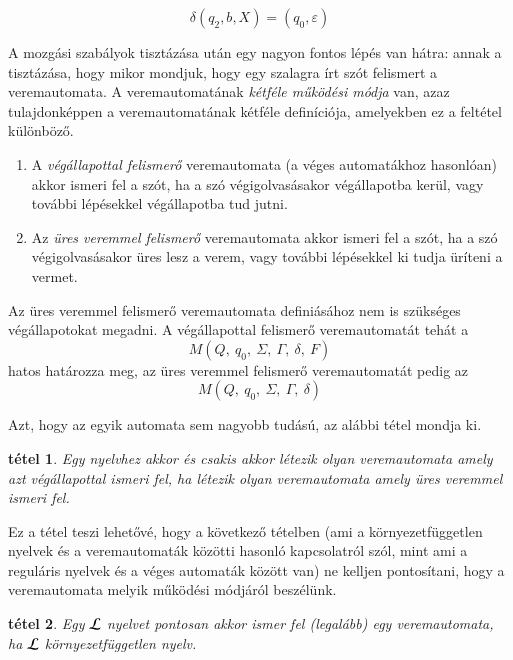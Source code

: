 \documentclass[a4paper]{article}
\newtheorem{tetel}{tétel}[section]
\begin{document}
\begin{equation*}
    \delta(q_2, b, X) = (q_0, \varepsilon)
\end{equation*}

A mozgási szabályok tisztázása után egy nagyon fontos lépés van hátra:
annak a tisztázása, hogy mikor mondjuk, hogy egy szalagra írt szót
felismert a veremautomata.
A veremautomatának \emph{kétféle működési módja} van, azaz
tulajdonképpen a veremautomatának kétféle definíciója, amelyekben ez a
feltétel különböző.
\begin{enumerate}
    \item A \emph{végállapottal felismerő} veremautomata (a véges
        automatákhoz hasonlóan) akkor ismeri fel a szót, ha a szó
        végigolvasásakor végállapotba kerül, vagy további lépésekkel
        végállapotba tud jutni.
    \item Az \emph{üres veremmel felismerő} veremautomata akkor ismeri
        fel a szót, ha a szó végigolvasásakor üres lesz a verem, vagy
        további lépésekkel ki tudja üríteni a vermet.
\end{enumerate}

Az üres veremmel felismerő veremautomata definiásához  nem is szükséges
végállapotokat megadni. A végállapottal felismerő veremautomatát tehát a
\begin{equation*}
    M(Q,\: q_0,\: \Sigma,\: \Gamma,\: \delta,\: F)
\end{equation*}
hatos határozza meg, az üres veremmel felismerő veremautomatát pedig az
\begin{equation*}
    M(Q,\: q_0,\: \Sigma,\: \Gamma,\: \delta)
\end{equation*}

Azt, hogy az egyik automata sem nagyobb tudású, az alábbi tétel mondja
ki.

\begin{tetel}
    Egy nyelvhez akkor és csakis akkor létezik olyan veremautomata amely
    azt végállapottal ismeri fel, ha létezik olyan veremautomata amely
    üres veremmel ismeri fel.
\end{tetel}

Ez a tétel teszi lehetővé, hogy a következő tételben (ami a
környezetfüggetlen nyelvek és a veremautomaták közötti hasonló
kapcsolatról szól, mint ami a reguláris nyelvek és a véges automaták
között van) ne kelljen pontosítani, hogy a veremautomata melyik működési
módjáról beszélünk.

\begin{tetel}
    Egy $\cal L$ nyelvet pontosan akkor ismer fel (legalább) egy
    veremautomata, ha $\cal L$ környezetfüggetlen nyelv.
\end{tetel}
\end{document}
